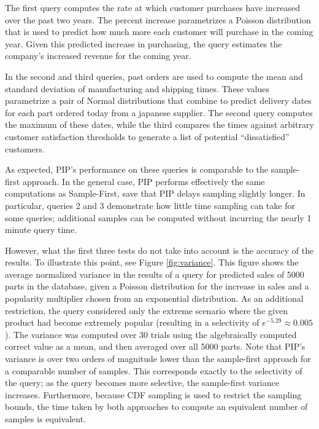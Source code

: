 The first query computes the rate at which customer purchases have increased over the past two years.  The percent increase parametrizes a Poisson distribution that is used to predict how much more each customer will purchase in the coming year.  Given this predicted increase in purchasing, the query estimates the company's increased revenue for the coming year.

In the second and third queries, past orders are used to compute the mean and standard deviation of manufacturing and shipping times.  These values parametrize a pair of Normal distributions that combine to predict delivery dates for each part ordered today from a japanese supplier.  The second query computes the maximum of these dates, while the third compares the times against arbitrary customer satisfaction thresholds to generate a list of potential ``dissatisfied'' customers.

As expected, PIP's performance on these queries is comparable to the sample-first approach.  In the general case, PIP performs effectively the same computations as Sample-First, save that PIP delays sampling slightly longer.  In particular, queries 2 and 3 demonstrate how little time sampling can take for some queries; additional samples can be computed without incurring the nearly 1 minute query time.

However, what the first three tests do not take into account is the accuracy of the results.  To illustrate this point, see Figure \ref{fig:variance}.  This figure shows the average normalized variance in the results of a query for predicted sales of 5000 parts in the database, given a Poisson distribution for the increase in sales and a popularity multiplier chosen from an exponential distribution.  As an additional restriction, the query considered only the extreme scenario where the given product had become extremely popular (resulting in a selectivity of $e^{-5.29} \approx 0.005$).  The variance was computed over 30 trials using the algebraically computed correct value as a mean, and then averaged over all 5000 parts.  Note that PIP's variance is over two orders of magnitude lower than the sample-first approach for a comparable number of samples.  This corresponds exactly to the selectivity of the query; as the query becomes more selective, the sample-first variance increases.  Furthermore, because CDF sampling is used to restrict the sampling bounds, the time taken by both approaches to compute an equivalent number of samples is equivalent.

